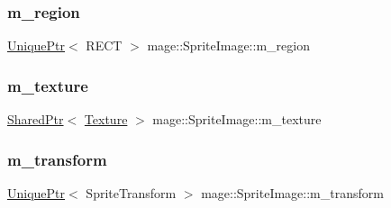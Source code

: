 \subsubsection{\texorpdfstring{m\+\_\+region}{m\_region}}
{\footnotesize\ttfamily \hyperlink{namespacemage_a8c307fbcc33bce9b7f2aa4c26c3b95cf}{Unique\+Ptr}$<$ R\+E\+CT $>$ mage\+::\+Sprite\+Image\+::m\+\_\+region\hspace{0.3cm}{\ttfamily [private]}}

\hypertarget{classmage_1_1_sprite_image_a8416fc862782dc019e15275261e7ca15}{}\label{classmage_1_1_sprite_image_a8416fc862782dc019e15275261e7ca15} 
\subsubsection{\texorpdfstring{m\+\_\+texture}{m\_texture}}
{\footnotesize\ttfamily \hyperlink{namespacemage_a1e01ae66713838a7a67d30e44c67703e}{Shared\+Ptr}$<$ \hyperlink{classmage_1_1_texture}{Texture} $>$ mage\+::\+Sprite\+Image\+::m\+\_\+texture\hspace{0.3cm}{\ttfamily [private]}}

\hypertarget{classmage_1_1_sprite_image_adcb9c0c4437cc9fe90957044cb8b76c0}{}\label{classmage_1_1_sprite_image_adcb9c0c4437cc9fe90957044cb8b76c0} 
\subsubsection{\texorpdfstring{m\+\_\+transform}{m\_transform}}
{\footnotesize\ttfamily \hyperlink{namespacemage_a8c307fbcc33bce9b7f2aa4c26c3b95cf}{Unique\+Ptr}$<$ Sprite\+Transform $>$ mage\+::\+Sprite\+Image\+::m\+\_\+transform\hspace{0.3cm}{\ttfamily [private]}}

